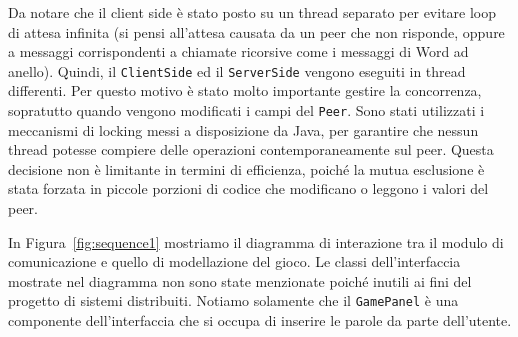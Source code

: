 \documentclass[9pt]{article}
\begin{document}
Da notare che il client side è stato posto su un thread separato per evitare loop di attesa infinita (si pensi all'attesa causata da un peer che non risponde, oppure a messaggi corrispondenti a chiamate ricorsive come i messaggi di Word ad anello).
Quindi, il \texttt{ClientSide} ed il \texttt{ServerSide} vengono eseguiti in thread differenti. Per questo motivo è stato molto importante gestire la concorrenza, sopratutto quando vengono modificati i campi del \texttt{Peer}. Sono stati utilizzati i meccanismi di locking messi a disposizione da Java, per garantire che nessun thread potesse compiere delle operazioni contemporaneamente sul peer. Questa decisione non è limitante in termini di efficienza, poiché la mutua esclusione è stata forzata in piccole porzioni di codice che modificano o leggono i valori del peer.

In Figura~\ref{fig:sequence1} mostriamo il diagramma di interazione tra il modulo di comunicazione e quello di modellazione del gioco. Le classi dell'interfaccia mostrate nel diagramma non sono state menzionate poiché inutili ai fini del progetto di sistemi distribuiti. Notiamo solamente che il \texttt{GamePanel} è una componente dell'interfaccia che si occupa di inserire le parole da parte dell'utente.
\end{document}
